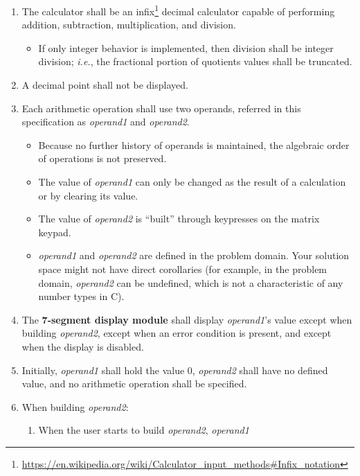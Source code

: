 \begin{enumerate}
\item \label{spec:IntegerCalculator} The calculator shall be an
    infix\footnote{\url{https://en.wikipedia.org/wiki/Calculator_input_methods\#Infix_notation}}
    decimal calculator capable of performing addition, subtraction,
    multiplication, and division.
    \begin{itemize}
    \item If only integer behavior is implemented, then division shall be
        integer division; \textit{i.e.}, the fractional portion of quotients
        values shall be truncated.
    \end{itemize}
\item \label{spec:NoDecimalPoint} A decimal point shall not be displayed.
\item Each arithmetic operation shall use two operands, referred in this
    specification as \textit{operand1} and \textit{operand2}.
    \begin{itemize}
    \item Because no further history of operands is maintained, the algebraic
        order of operations is not preserved.
    \item The value of \textit{operand1} can only be changed as the result of a
        calculation or by clearing its value.
    \item The value of \textit{operand2} is ``built'' through keypresses on the
        matrix keypad.
    \item \textit{operand1} and \textit{operand2} are defined in the problem
        domain. Your solution space might not have direct corollaries (for
        example, in the problem domain, \textit{operand2} can be undefined,
        which is not a characteristic of any number types in C).
    \end{itemize}
\item The \textbf{7-segment display module} shall display \textit{operand1}'s
    value except when building \textit{operand2}, except when an error
    condition is present, and except when the display is disabled.
\item Initially, \textit{operand1} shall hold the value 0, \textit{operand2}
    shall have no defined value, and no arithmetic operation shall be specified.
\item \label{spec:BuildingValue} When building \textit{operand2}:
    \begin{enumerate}
    \item When the user starts to build \textit{operand2}, \textit{operand1}

\end{enumerate}
\end{enumerate}
